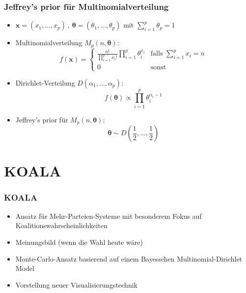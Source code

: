 \documentclass[aspectratio=169,xcolor=dvipsnames]{beamer}
\begin{document}
\begin{frame}
\frametitle{Jeffrey's prior für Multinomialverteilung}
\begin{itemize}
\item<1-> $\boldsymbol{x}=(x_1,\dots,x_p)\,,~\boldsymbol{\theta}=(\theta_1,\dots,\theta_p)$ mit $\sum_{i=1}^p\theta_p = 1$
\item<2-> Multinomialverteilung $M_p(n,\boldsymbol{\theta})$: $$f(\boldsymbol{x})=\left\{\begin{array}{ll}
\frac{n!}{\prod_{i=1}^{p}x_i!}\prod_{i=1}^{p}\theta_i^{x_i} & \text{falls }\sum_{i=1}^{p}x_i=n\\
0 & \text{sonst}
\end{array}\right.$$
\item<3-> Dirichlet-Verteilung $D(\alpha_1,\dots,\alpha_p)$: $$f(\boldsymbol{\theta})\propto\prod_{i=1}^{p}\theta_i^{\alpha_i-1}$$
\item<4-> Jeffrey's prior für $M_p(n,\boldsymbol{\theta})$:
$$\boldsymbol{\theta}\sim D\left(\frac{1}{2},\dots,\frac{1}{2}\right)$$
\end{itemize}
\end{frame}

\section{KOALA}

\begin{frame}
\frametitle{KOALA}
\begin{itemize}
\item Ansatz für Mehr-Parteien-Systeme mit besonderem Fokus auf Koalitionswahrscheinlichkeiten
\item Meinungsbild (wenn die Wahl heute wäre) 
\item Monte-Carlo-Ansatz basierend auf einem Bayesschen Multinomial-Dirichlet Model
\item Vorstellung neuer Visualisierungstechnik
\end{itemize}
\end{frame}
\end{document}
